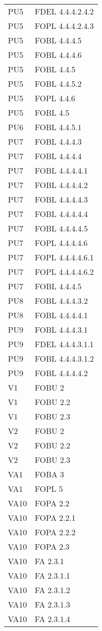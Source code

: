 \begin{longtable}{XX}
PU5&FDEL 4.4.4.2.4.2\\ 
PU5&FOPL 4.4.4.2.4.3\\ 
PU5&FOBL 4.4.4.5\\ 
PU5&FOBL 4.4.4.6\\ 
PU5&FOBL 4.4.5\\ 
PU5&FOBL 4.4.5.2\\ 
PU5&FOPL 4.4.6\\ 
PU5&FOBL 4.5\\ 
\midrule 
PU6&FOBL 4.4.5.1\\ 
\midrule 
PU7&FOBL 4.4.4.3\\ 
PU7&FOBL 4.4.4.4\\ 
PU7&FOBL 4.4.4.4.1\\ 
PU7&FOBL 4.4.4.4.2\\ 
PU7&FOBL 4.4.4.4.3\\ 
PU7&FOBL 4.4.4.4.4\\ 
PU7&FOBL 4.4.4.4.5\\ 
PU7&FOPL 4.4.4.4.6\\ 
PU7&FOPL 4.4.4.4.6.1\\ 
PU7&FOPL 4.4.4.4.6.2\\ 
PU7&FOBL 4.4.4.5\\ 
\midrule 
PU8&FOBL 4.4.4.3.2\\ 
PU8&FOBL 4.4.4.4.1\\ 
\midrule 
PU9&FOBL 4.4.4.3.1\\ 
PU9&FDEL 4.4.4.3.1.1\\ 
PU9&FOBL 4.4.4.3.1.2\\ 
PU9&FOBL 4.4.4.4.2\\ 
\midrule 
V1&FOBU 2\\ 
V1&FOBU 2.2\\ 
V1&FOBU 2.3\\ 
\midrule 
V2&FOBU 2\\ 
V2&FOBU 2.2\\ 
V2&FOBU 2.3\\ 
\midrule 
VA1&FOBA 3\\ 
VA1&FOPL 5\\ 
\midrule 
VA10&FOPA 2.2\\ 
VA10&FOPA 2.2.1\\ 
VA10&FOPA 2.2.2\\ 
VA10&FOPA 2.3\\ 
VA10&FA 2.3.1\\ 
VA10&FA 2.3.1.1\\ 
VA10&FA 2.3.1.2\\ 
VA10&FA 2.3.1.3\\ 
VA10&FA 2.3.1.4\\ 

\end{longtable}
